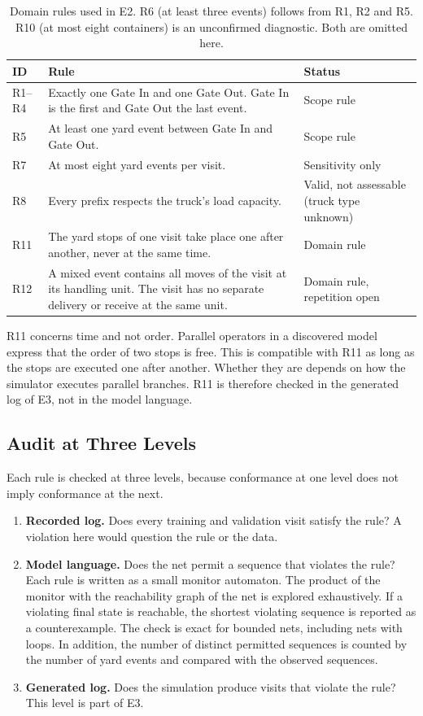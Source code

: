 \begin{table}[htbp]
\centering
\begin{tabularx}{\textwidth}{L{0.8cm}YL{3.5cm}}
\toprule
\textbf{ID} & \textbf{Rule} & \textbf{Status} \\
\midrule
R1--R4 & Exactly one Gate In and one Gate Out. Gate In is the first and Gate Out the last event. & Scope rule \\
R5 & At least one yard event between Gate In and Gate Out. & Scope rule \\
R7 & At most eight yard events per visit. & Sensitivity only \\
R8 & Every prefix respects the truck's load capacity. & Valid, not assessable (truck type unknown) \\
R11 & The yard stops of one visit take place one after another, never at the same time. & Domain rule \\
R12 & A mixed event contains all moves of the visit at its handling unit. The visit has no separate delivery or receive at the same unit. & Domain rule, repetition open \\
\bottomrule
\end{tabularx}
\caption{Domain rules used in E2. R6 (at least three events) follows
from R1, R2 and R5. R10 (at most eight containers) is an unconfirmed
diagnostic. Both are omitted here.}
\label{tab:exp_rules}
\end{table}

R11 concerns time and not order. Parallel operators in a discovered
model express that the order of two stops is free. This is compatible
with R11 as long as the stops are executed one after another. Whether
they are depends on how the simulator executes parallel branches. R11
is therefore checked in the generated log of E3, not in the model
language.

\subsection{Audit at Three Levels}

Each rule is checked at three levels, because conformance at one level
does not imply conformance at the next.

\begin{enumerate}
\item \textbf{Recorded log.} Does every training and validation visit
satisfy the rule? A violation here would question the rule or the data.
\item \textbf{Model language.} Does the net permit a sequence that
violates the rule? Each rule is written as a small monitor automaton.
The product of the monitor with the reachability graph of the net is
explored exhaustively. If a violating final state is reachable, the
shortest violating sequence is reported as a counterexample. The check
is exact for bounded nets, including nets with loops. In addition, the
number of distinct permitted sequences is counted by the number of
yard events and compared with the observed sequences.
\item \textbf{Generated log.} Does the simulation produce visits that
violate the rule? This level is part of E3.
\end{enumerate}

